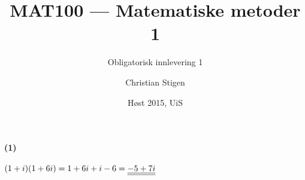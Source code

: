 \documentclass[a4paper,norsk,12pt]{article}
\title{MAT100 --- Matematiske metoder 1}
\subtitle{Obligatorisk innlevering 1}
\author{Christian Stigen}
\date{Høst 2015, UiS}
\begin{document}
\maketitle

\paragraph{(1)}
\begin{math}
  (1+i)(1+6i) = 1+6i+i-6 = {\underline{\underline{-5+7i}}}
\end{math}

\end{document}
